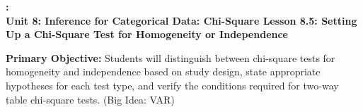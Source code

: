 \documentclass[10pt]{article}
\newcommand{\UnitNumberName}{Unit 8: Inference for Categorical Data: Chi-Square \quad}
\newcommand{\LessonNumberName}{Lesson 8.5: Setting Up a Chi-Square Test for Homogeneity or Independence}
\begin{document}
\begin{center}
    {\Large\bfseries \CourseName: \SchoolYear \\
    {\small\bfseries \UnitNumberName \LessonNumberName}}
\end{center}

\begin{tcolorbox}[colback=sky, colframe=navy, boxrule=0.9pt, arc=2mm,
    left=2mm, right=2mm, top=1.5mm, bottom=1.5mm]
    \textbf{Primary Objective:} Students will distinguish between chi-square tests for
    homogeneity and independence based on study design, state appropriate hypotheses for
    each test type, and verify the conditions required for two-way table chi-square tests.
    (Big Idea: VAR)
\end{tcolorbox}

\renewcommand{\arraystretch}{1.6}
\end{document}
